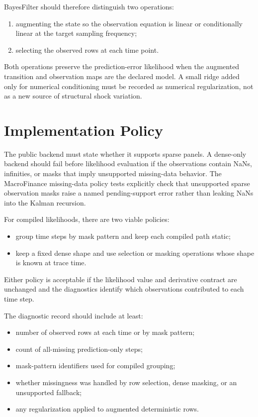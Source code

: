 BayesFilter should therefore distinguish two operations:
\begin{enumerate}[label=(\roman*)]
  \item augmenting the state so the observation equation is linear or
    conditionally linear at the target sampling frequency;
  \item selecting the observed rows at each time point.
\end{enumerate}
Both operations preserve the prediction-error likelihood when the augmented
transition and observation maps are the declared model.  A small ridge added
only for numerical conditioning must be recorded as numerical regularization,
not as a new source of structural shock variation.

\section{Implementation Policy}
\label{sec:bf-missing-implementation-policy}

The public backend must state whether it supports sparse panels.  A dense-only
backend should fail before likelihood evaluation if the observations contain
NaNs, infinities, or masks that imply unsupported missing-data behavior.  The
MacroFinance missing-data policy tests explicitly check that unsupported sparse
observation masks raise a named pending-support error rather than leaking NaNs
into the Kalman recursion.

For compiled likelihoods, there are two viable policies:
\begin{itemize}
  \item group time steps by mask pattern and keep each compiled path static;
  \item keep a fixed dense shape and use selection or masking operations whose
    shape is known at trace time.
\end{itemize}
Either policy is acceptable if the likelihood value and derivative contract are
unchanged and the diagnostics identify which observations contributed to each
time step.

The diagnostic record should include at least:
\begin{itemize}
  \item number of observed rows at each time or by mask pattern;
  \item count of all-missing prediction-only steps;
  \item mask-pattern identifiers used for compiled grouping;
  \item whether missingness was handled by row selection, dense masking, or an
    unsupported fallback;
  \item any regularization applied to augmented deterministic rows.
\end{itemize}

